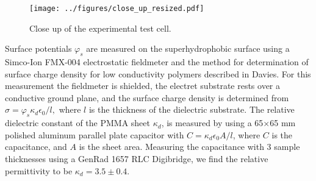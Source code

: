 \documentclass[aip,reprint, floatfix]{revtex4-1}
\begin{document}
\begin{figure}
    \centering
    \def\svgwidth{\columnwidth}
        \texttt{[image: ../figures/close\_up\_resized.pdf]}
    \caption{Close up of the experimental test cell.\label{fig:SEM}}
\end{figure}

Surface potentials $\varphi_s$ are measured on the superhydrophobic surface using a Simco-Ion FMX-004 electrostatic fieldmeter and the method for determination of surface charge density for low conductivity polymers described in Davies. \cite{davies_examination_1967} For this measurement the fieldmeter is shielded, the electret substrate rests over a conductive ground plane, and the surface charge density is determined from $\sigma = \varphi_s \kappa_d \epsilon_0/l,$ where $l$ is the thickness of the dielectric substrate. The relative dielectric constant of the PMMA sheet $\kappa_d$, is measured by using a 65$\times$65 mm polished aluminum parallel plate capacitor with $C = \kappa_d \epsilon_0 A/l$, where $C$ is the capacitance, and $A$ is the sheet area. Measuring the capacitance with 3 sample thicknesses using a GenRad 1657 RLC Digibridge, we find the relative permittivity to be $\kappa_d = 3.5 \pm 0.4$.  
\end{document}

